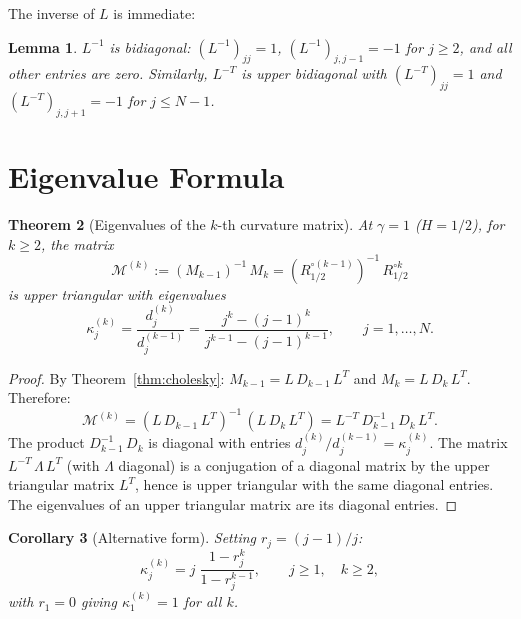 \documentclass[11pt,a4paper]{article}
\theoremstyle{plain}
\newtheorem{theorem}{Theorem}[section]
\newtheorem{lemma}[theorem]{Lemma}
\newtheorem{corollary}[theorem]{Corollary}
\theoremstyle{definition}
\theoremstyle{remark}
\begin{document}
The inverse of $L$ is immediate:

\begin{lemma}\label{lem:Linv}
$L^{-1}$ is bidiagonal: $(L^{-1})_{jj} = 1$,
$(L^{-1})_{j,j-1} = -1$ for $j \geq 2$, and
all other entries are zero. Similarly, $L^{-T}$ is
upper bidiagonal with $(L^{-T})_{jj} = 1$ and
$(L^{-T})_{j,j+1} = -1$ for $j \leq N-1$.
\end{lemma}


\section{Eigenvalue Formula}\label{sec:eigenvalues}

\begin{theorem}[Eigenvalues of the $k$-th curvature matrix]
\label{thm:eigenvalues}
At $\gamma = 1$ ($H = 1/2$), for $k \geq 2$, the matrix
\begin{equation}\label{eq:Mk-def}
  \mathcal{M}^{(k)}
  := (M_{k-1})^{-1}\,M_k
  = (R_{1/2}^{\circ(k-1)})^{-1}\,R_{1/2}^{\circ k}
\end{equation}
is upper triangular with eigenvalues
\begin{equation}\label{eq:eigenvalue-formula}
  \kappa_j^{(k)}
  = \frac{d_j^{(k)}}{d_j^{(k-1)}}
  = \frac{j^k - (j-1)^k}{j^{k-1} - (j-1)^{k-1}},
  \qquad j = 1,\ldots,N.
\end{equation}
\end{theorem}

\begin{proof}
By Theorem~\ref{thm:cholesky}:
$M_{k-1} = L\,D_{k-1}\,L^T$ and $M_k = L\,D_k\,L^T$.
Therefore:
\begin{equation}\label{eq:similarity}
  \mathcal{M}^{(k)}
  = (L\,D_{k-1}\,L^T)^{-1}\,(L\,D_k\,L^T)
  = L^{-T}\,D_{k-1}^{-1}\,D_k\,L^T.
\end{equation}
The product $D_{k-1}^{-1}\,D_k$ is diagonal with entries
$d_j^{(k)}/d_j^{(k-1)} = \kappa_j^{(k)}$.
The matrix $L^{-T}\,\Lambda\,L^T$
(with $\Lambda$ diagonal) is a conjugation of a diagonal matrix
by the upper triangular matrix $L^T$, hence is upper triangular
with the same diagonal entries.
The eigenvalues of an upper triangular matrix are its diagonal
entries.
\end{proof}

\begin{corollary}[Alternative form]\label{cor:alt-form}
Setting $r_j = (j-1)/j$:
\begin{equation}\label{eq:alt-form}
  \kappa_j^{(k)} = j\;\frac{1 - r_j^k}{1 - r_j^{k-1}},
  \qquad j \geq 1, \quad k \geq 2,
\end{equation}
with $r_1 = 0$ giving $\kappa_1^{(k)} = 1$ for all $k$.
\end{corollary}
\end{document}
